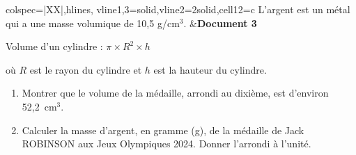 \documentclass[exercice,a4]{thedocument}%
\begin{document}
\begin{enumerate}
\begin{tblr}{colspec={|XX|},hlines, vline{1,3}={solid},vline{2}={2}{solid},cell{1}{2}={c}}
L'argent est un métal qui a une masse volumique de 10,5 g/cm$^3$. &\textbf{Document 3}

Volume d'un cylindre : $ \pi \times R^2 \times h$

où $R$ est le rayon du cylindre et $h$ est la hauteur du cylindre.\\
\end{tblr}

\medskip

	\begin{enumerate}
		\item Montrer que le volume de la médaille, arrondi au dixième, est d'environ 52,2~cm$^3$.
		\item Calculer la masse d'argent, en gramme (g), de la médaille de Jack ROBINSON aux Jeux Olympiques 2024. Donner l'arrondi à l'unité.
	\end{enumerate}
\end{enumerate}
\medskip
\showthesource
\end{document}
